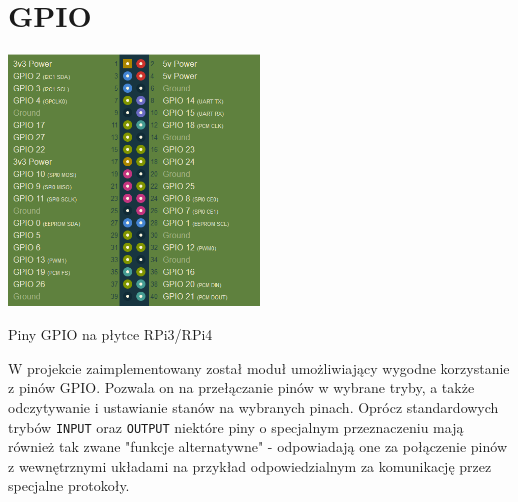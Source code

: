 \documentclass[shortabstract]{iithesis}
\begin{document}
\section{GPIO}
\begingroup
\centering
\includegraphics[width=0.5\textwidth]{gpio.png}
\captionsetup{type=figure}
\caption{Piny GPIO na płytce RPi3/RPi4}
\endgroup

W projekcie zaimplementowany został moduł umożliwiający wygodne korzystanie z pinów GPIO. Pozwala on na przełączanie pinów w wybrane tryby, a także odczytywanie i ustawianie stanów na wybranych pinach. Oprócz standardowych trybów \texttt{INPUT} oraz \texttt{OUTPUT} niektóre piny o specjalnym przeznaczeniu mają również tak zwane "funkcje alternatywne" - odpowiadają one za połączenie pinów z wewnętrznymi układami na przykład odpowiedzialnym za komunikację przez specjalne protokoły.
\end{document}
